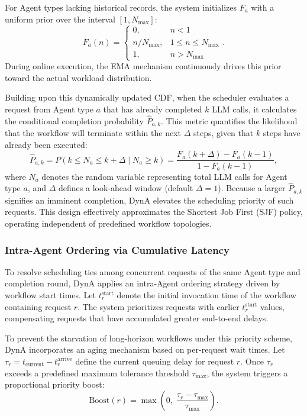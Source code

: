\documentclass[sigconf,review,anonymous]{acmart}
\begin{document}
For Agent types lacking historical records, the system initializes
$F_a$ with a uniform prior over the interval $\left[1, N_{\max}\right]$:
\[
  F_a(n) = \begin{cases}
    0,            & n < 1 \\
    n/N_{\max},   & 1 \le n \le N_{\max} \\
    1,            & n > N_{\max}
  \end{cases}.
\]
During online execution, the EMA mechanism continuously drives this prior toward 
the actual workload distribution.

Building upon this dynamically updated CDF, when the scheduler evaluates a request from
Agent type $a$ that has already completed $k$ LLM calls,
it calculates the conditional completion probability $\hat{P}_{a,k}$. 
This metric quantifies the likelihood that the workflow will terminate 
within the next $\Delta$ steps, given that $k$ steps have already been executed:
\begin{equation}
  \label{eq:conditional-prob}
  \hat{P}_{a,k} = P(k \le N_a \le k{+}\Delta \mid N_a \ge k)
                = \frac{F_a(k{+}\Delta) - F_a(k{-}1)}{1 - F_a(k{-}1)},
\end{equation}
where $N_a$ denotes the random variable representing total LLM calls for
Agent type $a$, and $\Delta$ defines a look-ahead window (default
$\Delta{=}1$). Because a larger $\hat{P}_{a,k}$ signifies an imminent completion, 
DynA elevates the scheduling priority of such requests. This design effectively 
approximates the Shortest Job First (SJF) policy, operating independent 
of predefined workflow topologies.

\subsubsection{Intra-Agent Ordering via Cumulative Latency}
\label{subsec:intra-agent}

To resolve scheduling ties among concurrent requests of the same Agent 
type and completion round, DynA applies an intra-Agent ordering strategy 
driven by workflow start times. Let
$t_r^{\text{start}}$ denote the initial invocation time of the workflow containing 
request $r$. The system prioritizes requests with earlier
$t_r^{\text{start}}$ values, compensating requests that have 
accumulated greater end-to-end delays.

To prevent the starvation of long-horizon workflows under this priority scheme, 
DynA incorporates an aging mechanism based on per-request wait times. 
Let $\tau_r = t_{\text{current}} - t_r^{\text{arrive}}$ define the current queuing 
delay for request $r$. Once $\tau_r$ exceeds a predefined maximum tolerance 
threshold $\tau_{\max}$, the system triggers a proportional priority boost:
\begin{equation}
  \label{eq:age-boost}
  \text{Boost}(r) = \max\!\left(0,\;\frac{\tau_r - \tau_{\max}}{\tau_{\max}}\right).
\end{equation}
\end{document}
